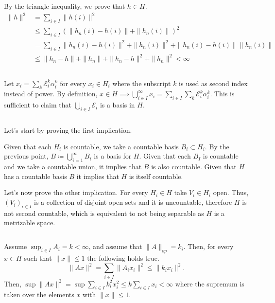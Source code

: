 \documentclass[a4paper,12pt]{article} %
\begin{document}
By the triangle inequality, we prove that \(h \in  H\).
\begin{align*}
    \| h \|^2 & = \sum_{i \in  I} \| h(i) \|^{2}                                                             \\
              & \leq \sum_{ i \in  I} (\| h_n(i)- h(i)  \| +\| h_{n}(i)  \| ) ^{2}                           \\
              & = \sum_{i \in I} \| h_n(i)-h(i) \|^{2} + \| h_n(i) \|^{2}  + \| h_n(i)- h(i) \| \| h_n(i) \| \\
              & \leq  \| h_{n} - h  \| + \| h_n \|  + \| h_n-h \| ^{2}  + \| h_n \|^{2}  < \infty
\end{align*}

\subsection{}
Let \(x_i = \sum_{k} \mathcal{E}_i^k \alpha _i^k \) for every \(x_i \in  H_i\) where the subscript \(k\) is used as second index instead of power.
By definition, \(x  \in  H \implies  \bigcup_{i \in I}^{\infty} x_{i} = \sum_{ i \in I} \sum_{k} \mathcal{E}^k_i \alpha _i^k  \).
This is sufficient to claim that \(\bigcup_{i \in I}\mathcal{E}_i \) is a basis in \(H\).

\subsection{}
Let's start by proving the first implication.

Given that each \(H_i\) is countable, we take a countable basis \(B_i \subset H_i\). By the previous point, \(B\coloneqq \bigcup_{i=1}^{\infty} B_i\) is a basis for \(H\). Given that each \(B_I\) is countable and we take a countable union, it implies that \(B\) is also countable. Given that \(H\) has a countable basis \(B\) it implies that \(H\) is itself countable.

Let's now prove the other implication. For every \(H_i \in  H\) take \(V_i \in  H_i\) open. Thus, \((V_i)_{i \in I}\) is a collection of disjoint open sets and it is uncountable, therefore \(H\) is not second countable, which is equivalent to not being separable as \(H\) is a metrizable space.

\subsection{}
Assume \(\sup_{i \in I}A_i =k<\infty \), and assume that \(\| A \|_{op} = k_i \). Then, for every \(x \in  H \) such that \(\| x \| \leq 1\) the following holds true.
\begin{equation}
    \| Ax \| ^2 = \sum_{i \in  I} \| A_i x_i \| ^{2} \leq \| k_i x_i \|^{2}.
\end{equation}
Then, \(\sup \| Ax \|^2 = \sup \sum_{i \in  I}k_i^{2}x_i^2 \leq k \sum_{i \in  I}x_i < \infty        \) where the supremum is taken over the elements \(x \) with \(\| x\|\leq 1 \).
\end{document}

